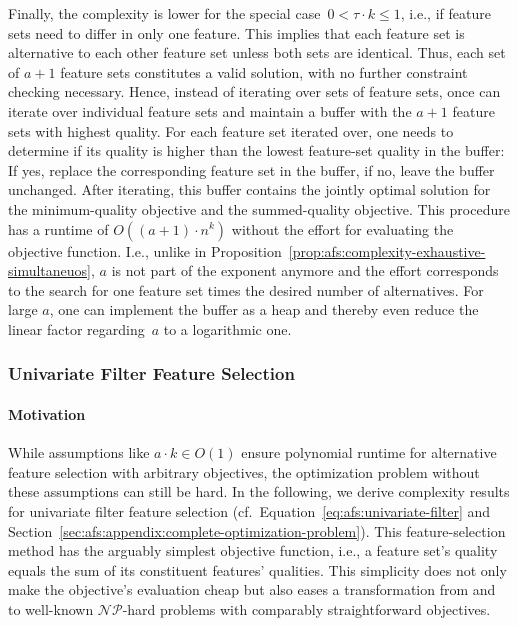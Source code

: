\documentclass{article}
\theoremstyle{definition}
\begin{document}
Finally, the complexity is lower for the special case~$0 < \tau \cdot k \leq 1$, i.e., if feature sets need to differ in only one feature.
This implies that each feature set is alternative to each other feature set unless both sets are identical.
Thus, each set of $a + 1$ feature sets constitutes a valid solution, with no further constraint checking necessary.
Hence, instead of iterating over sets of feature sets, once can iterate over individual feature sets and maintain a buffer with the $a + 1$ feature sets with highest quality.
For each feature set iterated over, one needs to determine if its quality is higher than the lowest feature-set quality in the buffer:
If yes, replace the corresponding feature set in the buffer, if no, leave the buffer unchanged.
After iterating, this buffer contains the jointly optimal solution for the minimum-quality objective and the summed-quality objective.
This procedure has a runtime of $O((a + 1) \cdot n^k)$ without the effort for evaluating the objective function.
I.e., unlike in Proposition~\ref{prop:afs:complexity-exhaustive-simultaneuos}, $a$ is not part of the exponent anymore and the effort corresponds to the search for one feature set times the desired number of alternatives.
For large $a$, one can implement the buffer as a heap and thereby even reduce the linear factor regarding~$a$ to a logarithmic one.

\subsubsection{Univariate Filter Feature Selection}
\label{sec:afs:appendix:complexity:uni}

\paragraph{Motivation}

While assumptions like $a \cdot k \in O(1)$ ensure polynomial runtime for alternative feature selection with arbitrary objectives, the optimization problem without these assumptions can still be hard.
In the following, we derive complexity results for univariate filter feature selection (cf.~Equation~\ref{eq:afs:univariate-filter} and Section~\ref{sec:afs:appendix:complete-optimization-problem}).
This feature-selection method has the arguably simplest objective function, i.e., a feature set's quality equals the sum of its constituent features' qualities.
This simplicity does not only make the objective's evaluation cheap but also eases a transformation from and to well-known $\mathcal{NP}$-hard problems with comparably straightforward objectives.
\end{document}
